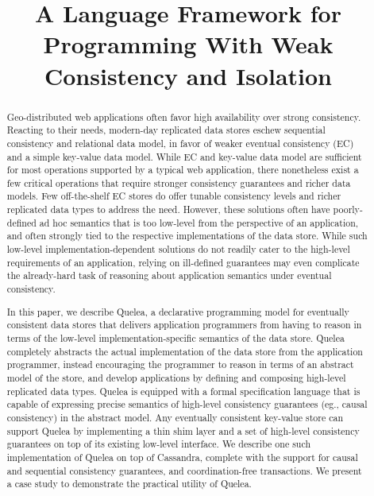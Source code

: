 \documentclass[11pt]{article}
\date{}
\newcommand{\name}{{\sc Quelea}\xspace}
\begin{document}
\title{A Language Framework for Programming With Weak Consistency and
Isolation}


\maketitle

\begin{abstract}
Geo-distributed web applications often favor high availability over
strong consistency. Reacting to their needs, modern-day replicated
data stores eschew sequential consistency and relational data model,
in favor of weaker eventual consistency (EC) and a simple key-value
data model. While EC and key-value data model are sufficient for most
operations supported by a typical web application, there nonetheless
exist a few critical operations that require stronger consistency
guarantees and richer data models. Few off-the-shelf EC stores do
offer tunable consistency levels and richer replicated data types to
address the need. However, these solutions often have poorly-defined
ad hoc semantics that is too low-level from the perspective of an
application, and often strongly tied to the respective implementations
of the data store. While such low-level implementation-dependent
solutions do not readily cater to the high-level requirements of an
application, relying on ill-defined guarantees may even complicate the
already-hard task of reasoning about application semantics under
eventual consistency. 

In this paper, we describe \name, a declarative programming model for
eventually consistent data stores that delivers application
programmers from having to reason in terms of the low-level
implementation-specific semantics of the data store. \name completely
abstracts the actual implementation of the data store from the
application programmer, instead encouraging the programmer to reason
in terms of an abstract model of the store, and develop applications
by defining and composing high-level replicated data types.  \name is
equipped with a formal specification language that is capable of
expressing precise semantics of high-level consistency guarantees
(eg., causal consistency) in the abstract model. Any eventually
consistent key-value store can support \name by implementing a thin
shim layer and a set of high-level consistency guarantees on top of
its existing low-level interface. We describe one such implementation
of \name on top of Cassandra, complete with the support for causal and
sequential consistency guarantees, and coordination-free transactions.
We present a case study to demonstrate the practical utility of \name.


\end{abstract}




{
 \small 
}
\end{document}
